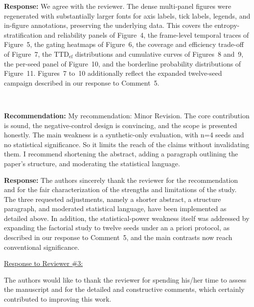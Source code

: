 \documentclass[1p,12pt,authoryear]{elsarticle}
\begin{document}
\vspace{2mm}
\noindent \textbf{Response:} We agree with the reviewer. The dense multi-panel figures were regenerated with substantially larger fonts for axis labels, tick labels, legends, and in-figure annotations, preserving the underlying data. This covers the entropy-stratification and reliability panels of Figure~4, the frame-level temporal traces of Figure~5, the gating heatmaps of Figure~6, the coverage and efficiency trade-off of Figure~7, the $\mathrm{TTD}_{\mathrm{ef}}$ distributions and cumulative curves of Figures~8 and~9, the per-seed panel of Figure~10, and the borderline probability distributions of Figure~11. Figures~7 to~10 additionally reflect the expanded twelve-seed campaign described in our response to Comment~5.

~

\noindent \textbf{Recommendation:} My recommendation: Minor Revision. The core contribution is sound, the negative-control design is convincing, and the scope is presented honestly. The main weakness is a synthetic-only evaluation, with n=4 seeds and no statistical significance. So it limits the reach of the claims without invalidating them. I recommend shortening the abstract, adding a paragraph outlining the paper's structure, and moderating the statistical language.

\vspace{2mm}
\noindent \textbf{Response:} The authors sincerely thank the reviewer for the recommendation and for the fair characterization of the strengths and limitations of the study. The three requested adjustments, namely a shorter abstract, a structure paragraph, and moderated statistical language, have been implemented as detailed above. In addition, the statistical-power weakness itself was addressed by expanding the factorial study to twelve seeds under an a priori protocol, as described in our response to Comment~5, and the main contrasts now reach conventional significance.

\newpage


\begin{large}
\noindent \underline{Response to Reviewer \#3:}
\end{large}

\vspace{10pt}

\noindent The authors would like to thank the reviewer for spending his/her time to assess the manuscript and for the detailed and constructive comments, which certainly contributed to improving this work.
\end{document}
